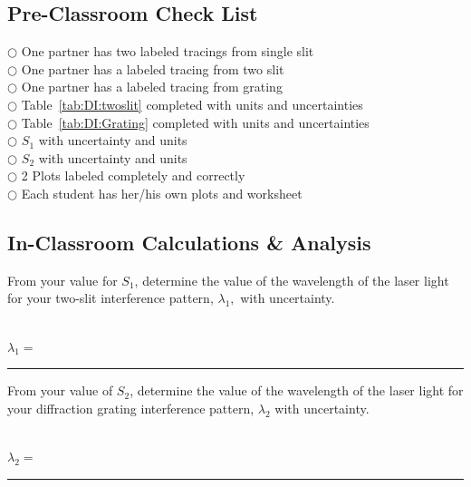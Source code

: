 \subsection{Pre-Classroom Check List}
$\bigcirc$ \hspace*{1cm} One partner has two labeled tracings from single slit \\
$\bigcirc$ \hspace*{1cm} One partner has a labeled tracing from two slit \\
$\bigcirc$ \hspace*{1cm} One partner has a labeled tracing from grating \\
$\bigcirc$ \hspace*{1cm} Table~\ref{tab:DI:twoslit} completed with units and uncertainties \\
$\bigcirc$ \hspace*{1cm} Table~\ref{tab:DI:Grating} completed with units and uncertainties \\
$\bigcirc$ \hspace*{1cm} $S_1$ with uncertainty and units \\
$\bigcirc$ \hspace*{1cm} $S_2$ with uncertainty and units \\
$\bigcirc$ \hspace*{1cm} 2 Plots labeled completely and correctly \\
$\bigcirc$ \hspace*{1cm} Each student has her/his own plots and worksheet \\
 


\subsection{In-Classroom Calculations \& Analysis}


From your value for $S_1$, determine the value of the wavelength of
the laser light for your two-slit interference pattern, $\lambda _1,$
with uncertainty. \\
\vspace*{2cm} \\
\begin{center}
$\lambda _1=$~ \rule{3cm}{.1mm} 
\end{center}
\noindent From your value of $S_2$, determine the value of
the wavelength of the laser light for your diffraction grating
interference pattern, $\lambda _2$ with uncertainty. \\
\vspace*{2cm} \\
\begin{center}
$\lambda _2=$~ \rule{3cm}{.1mm}
\end{center}

